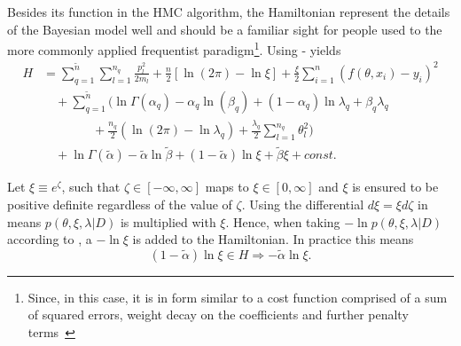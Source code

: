 Besides its function in the HMC algorithm, the Hamiltonian represent the details of the Bayesian model well and should be a familiar sight for people used to the more commonly applied frequentist paradigm\footnote{Since, in this case, it is in form similar to a cost function comprised of a sum of squared errors, weight decay on the coefficients and further penalty terms~\citep{hastie_09,murphy2013machine,Goodfellow2016}}. Using - yields
\begin{equation}
	\begin{split}
		H&=\sum_{q=1}^{\tilde{n}}\sum_{l=1}^{n_q}\frac{p_{l}^2}{2m_{l}}+\frac{n}{2}[\ln(2\pi)-\ln\xi] +\frac{\xi}{2}\sum_{i=1}^{n}(f(\theta,x_i)-y_i)^2\\
		&\quad+\sum_{q=1}^{\tilde{n}}\bigg(\ln\Gamma(\alpha_q)-\alpha_q\ln(\beta_q)+(1-\alpha_q)\ln\lambda_q+\beta_q\lambda_q\\
		&\qquad\qquad+\frac{n_q}{2}(\ln(2\pi)-\ln\lambda_q)+\frac{\lambda_q}{2}\sum_{l=1}^{n_q}\theta_l^2\bigg)\\
		&\quad+\ln\Gamma(\tilde{\alpha})-\tilde{\alpha}\ln\tilde{\beta}+(1-\tilde{\alpha})\ln\xi+\tilde{\beta}\xi+const.
	\end{split}
	\label{eqh2}
\end{equation}


\begin{example}
	Let $\xi \equiv e^\zeta$, such that $\zeta\in [-\infty,\infty]$ maps to $\xi\in[0,\infty]$ and $\xi$ is ensured to be positive definite regardless of the value of $\zeta$. Using the differential $d\xi =  \xi d\zeta$ in  means $p(\theta,\xi,\lambda|D)$ is multiplied with $\xi$. Hence, when taking $-\ln p(\theta,\xi,\lambda|D)$ according to , a $-\ln\xi$ is added to the Hamiltonian. In practice this means
	\begin{equation}
		(1-\tilde{\alpha})\ln\xi\in H\Rightarrow -\tilde{\alpha}\ln\xi.
	\end{equation} 	
\end{example}

